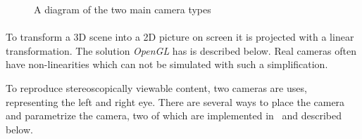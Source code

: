 \begin{figure}[hbt]
\begin{center}
\caption{A diagram of the two main camera types}
\end{center}
\end{figure}

\paragraph{}
To transform a 3D scene into a 2D picture on screen it is projected with a linear transformation.
The solution \textit{OpenGL} has is described below.
Real cameras often have non-linearities which can not be simulated with such a simplification.

To reproduce stereoscopically viewable content, two cameras are uses, representing the left and right eye.
There are several ways to place the camera and parametrize the camera, two of which are implemented in \ER\ and described below.


